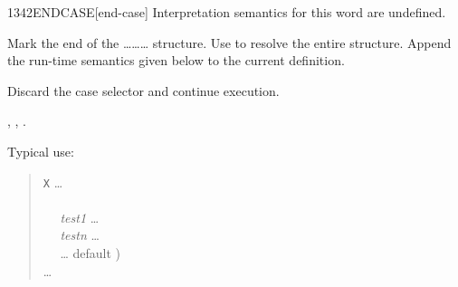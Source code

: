 \begin{worddef}{1342}{ENDCASE}[end-case]
\interpret
	Interpretation semantics for this word are undefined.

\compile

	Mark the end of the
	\ldots{}\ldots{}\ldots{}
	structure. Use  to resolve the entire structure.
	Append the run-time semantics given below to the current
	definition.

\runtime

	Discard the case selector  and continue execution.

\see {},
	,
	.

	\begin{defer}
	\rationale %
		Typical use:
		\begin{quote}
			\word{:} \texttt{X} {\ldots} \\
			\tab {} \\
			\tab~~ \emph{test1}  {\ldots}  \\
			\tab~~ \emph{testn}  {\ldots}  \\
			\tab~~ {\ldots}  default ) \\
			\tab {} {\ldots} \\
			\word{;}
		\end{quote}
	\end{defer}
\end{worddef}


